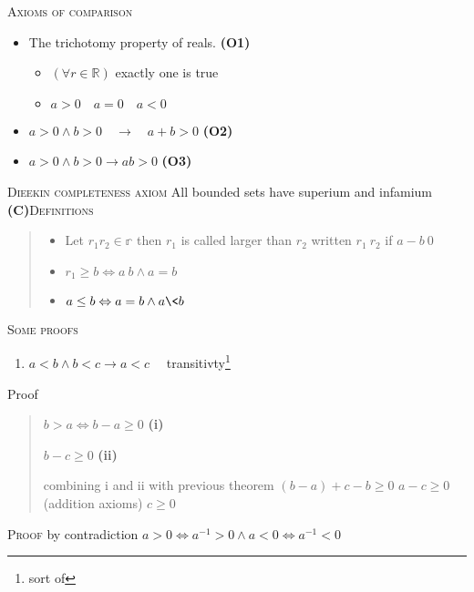 \documentclass{tufte-handout}
\providecommand{\tightlist}{%
  \setlength{\itemsep}{0pt}\setlength{\parskip}{0pt}}
\begin{document}
\textsc{Axioms of comparison}

\begin{itemize}
\item
  The trichotomy property of reals. \textbf{(O1)}

  \begin{itemize}
  \tightlist
  \item
    \(\left( \forall r \in \mathbb{R} \right)\) exactly one is true
  \item
    \(a > 0 \quad a = 0 \quad a < 0\)
  \end{itemize}
\item
  \(a > 0 \wedge b > 0 \quad \to \quad a + b >0\) \textbf{(O2)}
\item
  \(a > 0 \wedge b > 0 \to ab >0\) \textbf{(O3)}
\end{itemize}

\textsc{Dieekin completeness axiom} All bounded sets have superium and
infamium \textbf{(C)}\textsc{Definitions}

\begin{quote}
\begin{itemize}
\tightlist
\item
  Let \(r_1 r_2 \in \mathbb{r}\) then \(r_1\) is called larger than
  \(r_2\) written \(r_1 \> r_2\) if \(a - b \> 0\)
\item
  \(r_1 \geq b \Leftrightarrow a \> b \wedge a = b\)
\item
  \(a \leq b \Leftrightarrow a = b \wedge a \< b\)
\end{itemize}
\end{quote}

\textsc{Some proofs}

\begin{enumerate}
\def\labelenumi{\alph{enumi})}
\setcounter{enumi}{1}
\tightlist
\item
  \(a < b \wedge b < c \to a < c\quad\) transitivty\footnote{sort of}
\end{enumerate}

Proof

\begin{quote}
\(b > a \Leftrightarrow b-a \geq 0\) \textbf{(i)}

\(b -c \geq 0\) \textbf{(ii)}

combining i and ii with previous theorem \((b-a) + c - b \geq 0\)
\(a - c \geq 0\) (addition axioms) \(c \geq 0\)
\end{quote}

\textsc{Proof} by contradiction
\(a > 0 \Leftrightarrow a^{-1} > 0 \wedge a < 0 \Leftrightarrow a^{-1} < 0\)
\end{document}
